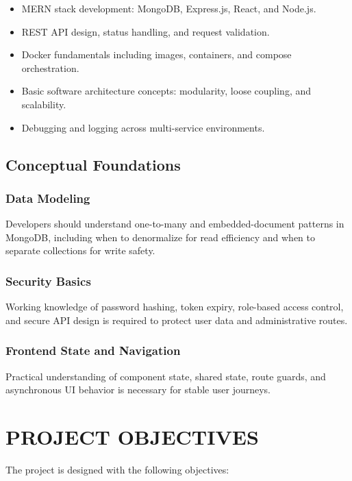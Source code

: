 \documentclass[12pt,a4paper]{report}
\begin{document}
\begin{itemize}
    \item MERN stack development: MongoDB, Express.js, React, and Node.js.
    \item REST API design, status handling, and request validation.
    \item Docker fundamentals including images, containers, and compose orchestration.
    \item Basic software architecture concepts: modularity, loose coupling, and scalability.
    \item Debugging and logging across multi-service environments.
\end{itemize}

\section{Conceptual Foundations}
\subsection{Data Modeling}
Developers should understand one-to-many and embedded-document patterns in MongoDB, including when to denormalize for read efficiency and when to separate collections for write safety.

\subsection{Security Basics}
Working knowledge of password hashing, token expiry, role-based access control, and secure API design is required to protect user data and administrative routes.

\subsection{Frontend State and Navigation}
Practical understanding of component state, shared state, route guards, and asynchronous UI behavior is necessary for stable user journeys.

\chapter{PROJECT OBJECTIVES}
The project is designed with the following objectives:
\end{document}
